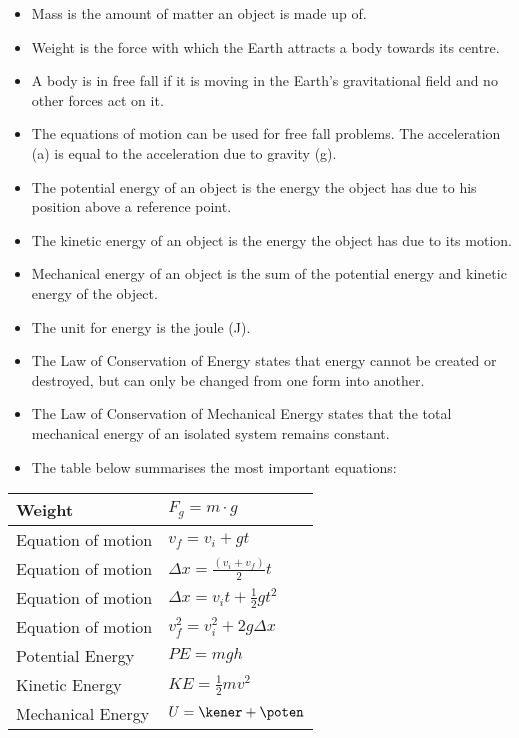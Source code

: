 \begin{itemize}
\item Mass is the amount of matter an object is made up of. 
\item Weight is the force with which the Earth attracts a body towards its centre.
\item A body is in free fall if it is moving in the Earth's gravitational field and no other forces act on it.
\item The equations of motion can be used for free fall problems. The acceleration (a) is equal to the acceleration due to gravity (g).
\item The potential energy of an object is the energy the object has due to his position above a reference point.
\item The kinetic energy of an object is the energy the object has due to its motion.
\item Mechanical energy of an object is the sum of the potential energy and kinetic energy of the object.
\item The unit for energy is the joule (J).
\item The Law of Conservation of Energy states that energy cannot be created or destroyed, but can only be changed from one form into another.
\item The Law of Conservation of Mechanical Energy states that the total mechanical energy of an isolated system remains constant.
\item The table below summarises the most important equations:
\end{itemize}

\begin{center}
\begin{tabular}{|l|l|}\hline
Weight & $F_g=m\cdot g$\\\hline
Equation of motion & $v_f = v_i + gt$\\\hline
Equation of motion & $\Delta x = \frac{(v_i + v_f)}{2} t$\\\hline
Equation of motion & $\Delta x = v_it + \frac{1}{2}gt^2$\\\hline
Equation of motion & $v_f^2 = v_i^2 + 2g \Delta x$\\\hline
Potential Energy & $PE=mgh$\\\hline
Kinetic Energy & $KE=\frac{1}{2}mv^2$\\\hline
Mechanical Energy & $U=\kener+\poten$\\\hline
\end{tabular}
\end{center}

